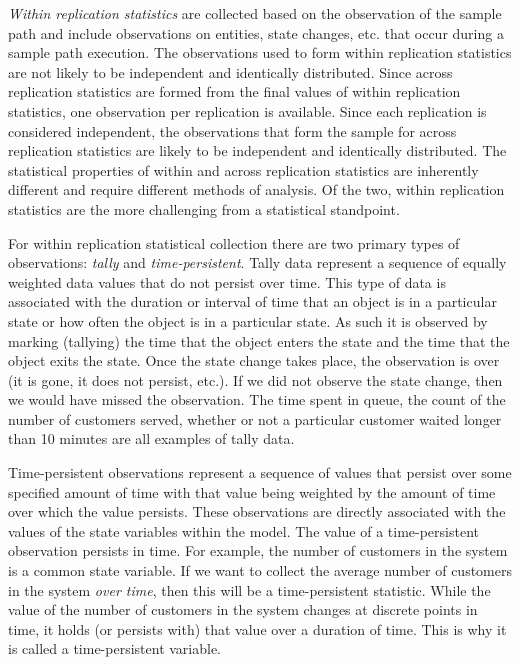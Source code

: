 \documentclass[
]{book}
\theoremstyle{definition}
\theoremstyle{definition}
\theoremstyle{definition}
\theoremstyle{definition}
\theoremstyle{remark}
\begin{document}
\emph{Within replication statistics} are collected based on the observation
of the sample path and include observations on entities, state changes,
etc. that occur during a sample path execution. The observations used to
form within replication statistics are not likely to be independent and
identically distributed. Since across replication statistics are formed
from the final values of within replication statistics, one observation
per replication is available. Since each replication is considered
independent, the observations that form the sample for across
replication statistics are likely to be independent and identically
distributed. The statistical properties of within and across replication
statistics are inherently different and require different methods of
analysis. Of the two, within replication statistics are the more
challenging from a statistical standpoint.

For within replication statistical collection there are two primary
types of observations: \emph{tally} and \emph{time-persistent}. Tally data
represent a sequence of equally weighted data values that do not persist
over time. This type of data is associated with the duration or
interval of time that an object is in a particular state or how often
the object is in a particular state. As such it is observed by marking
(tallying) the time that the object enters the state and the time that
the object exits the state. Once the state change takes place, the
observation is over (it is gone, it does not persist, etc.). If we did
not observe the state change, then we would have missed the observation.
The time spent in queue, the count of the number of customers served,
whether or not a particular customer waited longer than 10 minutes are
all examples of tally data.

Time-persistent observations represent a sequence of values that persist
over some specified amount of time with that value being weighted by the
amount of time over which the value persists. These observations are
directly associated with the values of the state variables within the
model. The value of a time-persistent observation persists in time. For
example, the number of customers in the system is a common state
variable. If we want to collect the average number of customers in the
system \emph{over time}, then this will be a time-persistent statistic. While
the value of the number of customers in the system changes at discrete
points in time, it holds (or persists with) that value over a duration
of time. This is why it is called a time-persistent variable.
\end{document}
